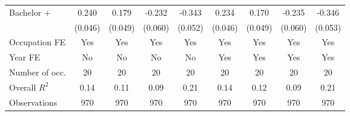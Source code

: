 \begin{landscape}
\begin{center}
\begin{threeparttable}[!h]
\begin{tabular}{lcccccccc}
Bachelor +          &       0.240\sym{***}&       0.179\sym{***}&      -0.232\sym{***}&      -0.343\sym{***}&       0.234\sym{***}&       0.170\sym{***}&      -0.235\sym{***}&      -0.346\sym{***}\\
                    &     (0.046)         &     (0.049)         &     (0.060)         &     (0.052)         &     (0.046)         &     (0.049)         &     (0.060)         &     (0.053)         \\
Occupation FE       &         Yes         &         Yes         &         Yes         &         Yes         &         Yes         &         Yes         &         Yes         &         Yes         \\
Year FE             &          No         &          No         &          No         &          No         &         Yes         &         Yes         &         Yes         &         Yes         \\
\midrule Number of occ.&          20         &          20         &          20         &          20         &          20         &          20         &          20         &          20         \\
Overall $ R^2$      &        0.14         &        0.11         &        0.09         &        0.21         &        0.14         &        0.12         &        0.09         &        0.21         \\
Observations        &         970         &         970         &         970         &         970         &         970         &         970         &         970         &         970         \\
\bottomrule
\bottomrule
\end{tabular}
\end{threeparttable}
\end{center}
\end{landscape}
